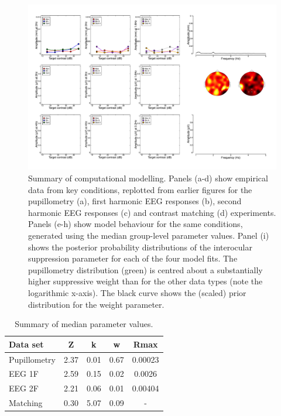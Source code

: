 \documentclass[
]{article}
\begin{document}
\begin{figure}

{\centering \includegraphics{Figures/blank} 

}

\caption{Summary of computational modelling. Panels (a-d) show empirical data from key conditions, replotted from earlier figures for the pupillometry (a), first harmonic EEG responses (b), second harmonic EEG responses (c) and contrast matching (d) experiments. Panels (e-h) show model behaviour for the same conditions, generated using the median group-level parameter values.  Panel (i) shows the posterior probability distributions of the interocular suppression parameter for each of the four model fits. The pupillometry distribution (green) is centred about a substantially higher suppressive weight than for the other data types (note the logarithmic x-axis). The black curve shows the (scaled) prior distribution for the weight parameter.}\label{fig:modelfigure}
\end{figure}

\begin{table}

\caption{\label{tab:paramtable}Summary of median parameter values.}
\centering
\begin{tabular}[t]{l|c|c|c|c}
\hline
Data set & Z & k & w & Rmax\\
\hline
Pupillometry & 2.37 & 0.01 & 0.67 & 0.00023\\
\hline
EEG 1F & 2.59 & 0.15 & 0.02 & 0.0026\\
\hline
EEG 2F & 2.21 & 0.06 & 0.01 & 0.00404\\
\hline
Matching & 0.30 & 5.07 & 0.09 & -\\
\hline
\end{tabular}
\end{table}
\end{document}
